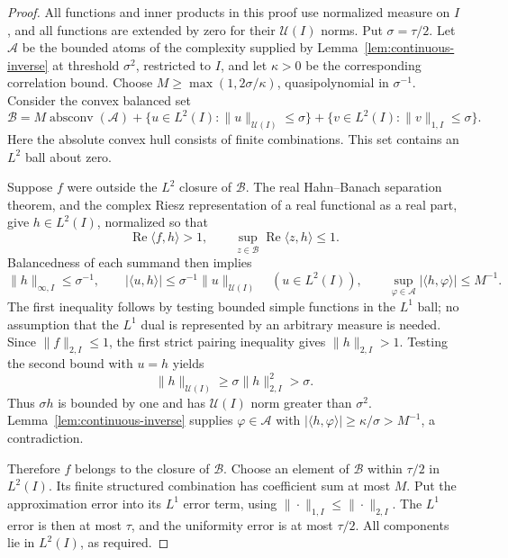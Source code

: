 \begin{proof}
All functions and inner products in this proof use normalized measure
on \(I\), and all functions are extended by zero for their
\(\mathcal U(I)\) norms.
Put \(\sigma=\tau/2\).
Let \(\mathcal A\) be the bounded atoms of the complexity supplied by
Lemma~\ref{lem:continuous-inverse} at threshold \(\sigma^2\), restricted
to \(I\), and let \(\kappa>0\) be the corresponding correlation bound.
Choose \(M\ge\max(1,2\sigma/\kappa)\), quasipolynomial in
\(\sigma^{-1}\).  Consider the convex balanced set
\[
 \mathcal B=
 M\operatorname{absconv}(\mathcal A)
 +\{u\in L^2(I):\|u\|_{\mathcal U(I)}\le\sigma\}
 +\{v\in L^2(I):\|v\|_{1,I}\le\sigma\}.
\]
Here the absolute convex hull consists of finite combinations.
This set contains an \(L^2\) ball about zero.

Suppose \(f\) were outside the \(L^2\) closure of \(\mathcal B\).
The real Hahn--Banach separation theorem, and the complex Riesz
representation of a real functional as a real part, give
\(h\in L^2(I)\), normalized so that
\[
 \operatorname{Re}\langle f,h\rangle>1,\qquad
 \sup_{z\in\mathcal B}\operatorname{Re}\langle z,h\rangle\le1.
\]
Balancedness of each summand then implies
\[
 \|h\|_{\infty,I}\le\sigma^{-1},\qquad
 |\langle u,h\rangle|
       \le\sigma^{-1}\|u\|_{\mathcal U(I)}
          \quad(u\in L^2(I)),\qquad
 \sup_{\varphi\in\mathcal A}|\langle h,\varphi\rangle|\le M^{-1}.
\]
The first inequality follows by testing bounded simple functions in
the \(L^1\) ball; no assumption that the \(L^1\) dual is represented
by an arbitrary measure is needed.
Since \(\|f\|_{2,I}\le1\), the first strict pairing inequality gives
\(\|h\|_{2,I}>1\).
Testing the second bound with \(u=h\) yields
\[
 \|h\|_{\mathcal U(I)}
       \ge\sigma\|h\|_{2,I}^2>\sigma.
\]
Thus \(\sigma h\) is bounded by one and has
\(\mathcal U(I)\) norm greater than \(\sigma^2\).
Lemma~\ref{lem:continuous-inverse} supplies \(\varphi\in\mathcal A\)
with
\(|\langle h,\varphi\rangle|\ge\kappa/\sigma>M^{-1}\),
a contradiction.

Therefore \(f\) belongs to the closure of \(\mathcal B\).
Choose an element of \(\mathcal B\) within \(\tau/2\) in \(L^2(I)\).
Its finite structured combination has coefficient sum at most \(M\).
Put the approximation error into its \(L^1\) error term, using
\(\|\cdot\|_{1,I}\le\|\cdot\|_{2,I}\).
The \(L^1\) error is then at most \(\tau\), and the uniformity error is
at most \(\tau/2\).  All components lie in \(L^2(I)\), as required.
\end{proof}

